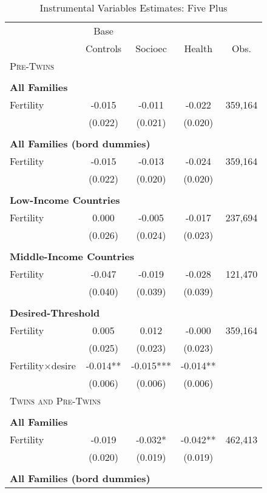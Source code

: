\begin{table}[!htbp] \centering 
\caption{Instrumental Variables Estimates: Five Plus} 
\label{TWINtab:IVFiveplus} 
\begin{tabular}{lcccc} \toprule \toprule 
&Base&&&\\
&Controls&Socioec&Health&Obs.\\\midrule
\multicolumn{5}{l}{\textsc{Pre-Twins}}\\ 
&&&&\\
\multicolumn{5}{l}{\textbf{All Families}}\\ 
Fertility&-0.015&-0.011&-0.022&359,164\\
         &(0.022)&(0.021)&(0.020)&\\
&&&&\\
\multicolumn{5}{l}{\textbf{All Families (bord dummies)}}\\ 
Fertility&-0.015&-0.013&-0.024&359,164\\
         &(0.022)&(0.020)&(0.020)&\\
&&&&\\
\multicolumn{5}{l}{\textbf{Low-Income Countries}}\\ 
Fertility&0.000&-0.005&-0.017&237,694\\
         &(0.026)&(0.024)&(0.023)&\\
&&&&\\
\multicolumn{5}{l}{\textbf{Middle-Income Countries}}\\ 
Fertility&-0.047&-0.019&-0.028&121,470\\
         &(0.040)&(0.039)&(0.039)&\\
&&&&\\
\multicolumn{5}{l}{\textbf{Desired-Threshold}}\\ 
Fertility&0.005&0.012&-0.000&359,164\\
         &(0.025)&(0.023)&(0.023)&\\
Fertility$\times$desire&-0.014**&-0.015***&-0.014**&\\
         &(0.006)&(0.006)&(0.006)&\\
\midrule\multicolumn{5}{l}{\textsc{Twins and Pre-Twins}}\\ 
&&&&\\
\multicolumn{5}{l}{\textbf{All Families}}\\ 
Fertility&-0.019&-0.032*&-0.042**&462,413\\
         &(0.020)&(0.019)&(0.019)&\\
&&&&\\
\multicolumn{5}{l}{\textbf{All Families (bord dummies)}}\\ 

\end{tabular}
\end{table}
